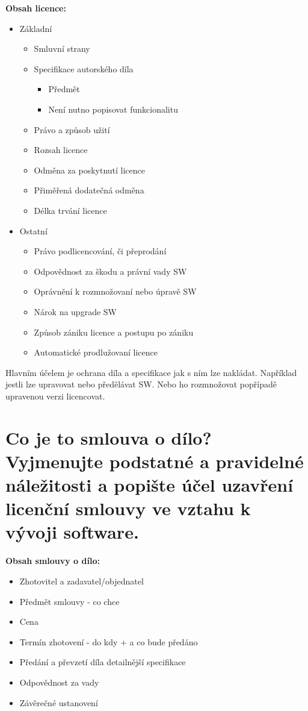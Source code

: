 \noindent\textbf{Obsah licence:}
\begin{itemize}[noitemsep]
    \item Základní
    \begin{itemize}[noitemsep]
        \item Smluvní strany
        \item Specifikace autorského díla
        \begin{itemize}[noitemsep]
            \item Předmět
            \item Není nutno popisovat funkcionalitu
        \end{itemize}
        \item Právo a způsob užití
        \item Rozsah licence
        \item Odměna za poskytnutí licence
        \item Přiměřená dodatečná odměna
        \item Délka trvání licence
    \end{itemize}
    \item Ostatní
    \begin{itemize}[noitemsep]
        \item Právo podlicencování, či přeprodání
        \item Odpovědnost za škodu a právní vady SW
        \item Oprávnění k rozmnožovaní nebo úpravě SW
        \item Nárok na upgrade SW
        \item Způsob zániku licence a postupu po zániku
        \item Automatické prodlužovaní licence
    \end{itemize}
\end{itemize}
  
Hlavním účelem je ochrana díla a specifikace jak s ním lze nakládat. Například jestli lze upravovat nebo předělávat SW. Nebo ho rozmnožovat popřípadě upravenou verzi licencovat. 


\vspace{0.5cm} 
\section{Co je to smlouva o dílo? Vyjmenujte podstatné a pravidelné náležitosti a popište účel uzavření licenční smlouvy ve vztahu k vývoji software.}

\noindent\textbf{Obsah smlouvy o dílo:}
\begin{itemize}[noitemsep]
    \setlength\itemsep{0em}
    \item Zhotovitel a zadavatel/objednatel
    \item Předmět smlouvy - co chce
    \item Cena
    \item Termín zhotovení - do kdy + a co bude předáno
    \item Předání a převzetí díla detailnější specifikace
    \item Odpovědnost za vady
    \item Závěrečné ustanovení
\end{itemize}


